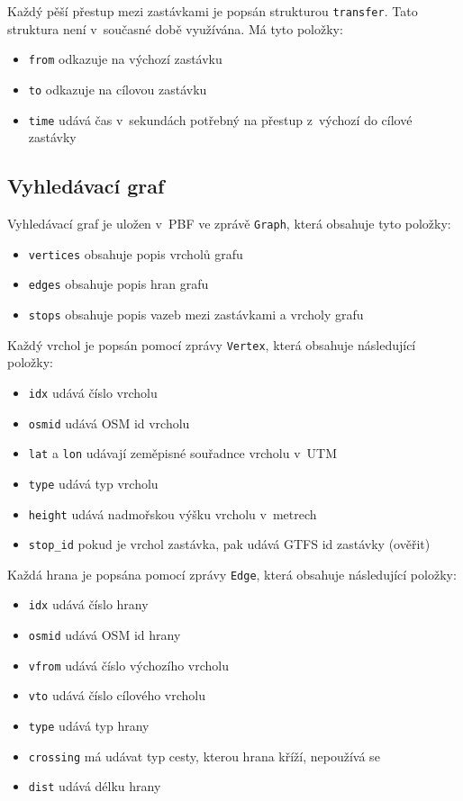 Každý pěší přestup mezi zastávkami je popsán strukturou {\tt transfer}. Tato
struktura není v~současné době využívána. Má tyto položky:
\begin{itemize}
	\item {\tt from} odkazuje na výchozí zastávku
	\item {\tt to} odkazuje na cílovou zastávku
	\item {\tt time} udává čas v~sekundách potřebný na přestup z~výchozí do
	cílové zastávky
\end{itemize}

\subsection{Vyhledávací graf}
Vyhledávací graf je uložen v~PBF ve zprávě {\tt Graph}, která obsahuje tyto
položky:
\begin{itemize}
	\item {\tt vertices} obsahuje popis vrcholů grafu
	\item {\tt edges} obsahuje popis hran grafu
	\item {\tt stops} obsahuje popis vazeb mezi zastávkami a vrcholy grafu 
\end{itemize} 
Každý vrchol je popsán pomocí zprávy {\tt Vertex}, která obsahuje následující
položky:
\begin{itemize}
	\item {\tt idx} udává číslo vrcholu
	\item {\tt osmid} udává OSM id vrcholu
	\item {\tt lat} a {\tt lon} udávají zeměpisné souřadnce vrcholu v~UTM
	\item {\tt type} udává typ vrcholu
	\item {\tt height} udává nadmořskou výšku vrcholu v~metrech
	\item {\tt stop\_id} pokud je vrchol zastávka, pak udává GTFS id
	zastávky (\TODO ověřit) 
\end{itemize} 
Každá hrana je popsána pomocí zprávy {\tt Edge}, která obsahuje následující
položky: 
\begin{itemize}
	\item {\tt idx} udává číslo hrany
	\item {\tt osmid} udává OSM id hrany
	\item {\tt vfrom} udává číslo výchozího vrcholu 
	\item {\tt vto} udává číslo cílového vrcholu
	\item {\tt type} udává typ hrany
	\item {\tt crossing} má udávat typ cesty, kterou hrana kříží, nepoužívá
	se
	\item {\tt dist} udává délku hrany
\end{itemize} 

